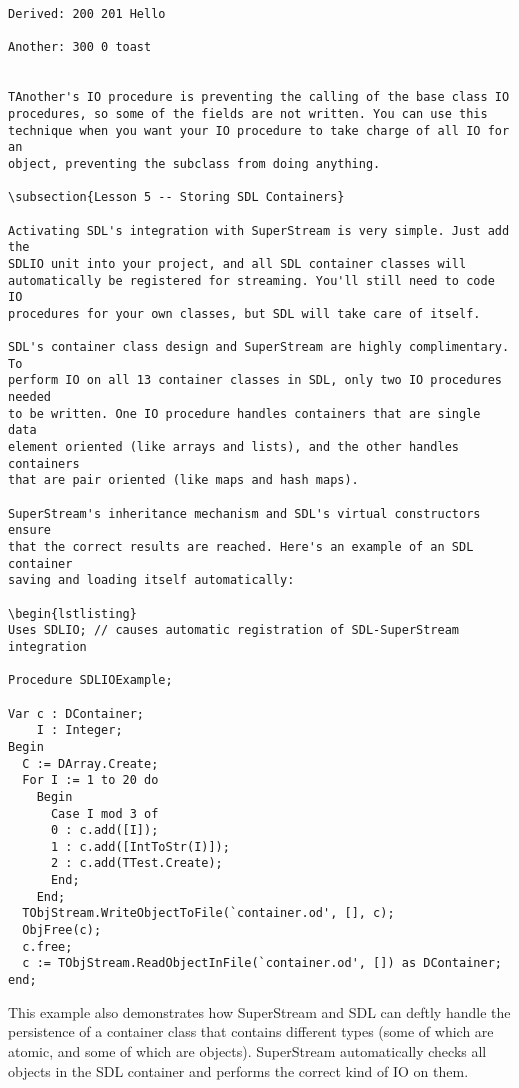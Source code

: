 \documentclass{report}
\begin{document}
\begin{lstlisting}
Derived: 200 201 Hello

Another: 300 0 toast


TAnother's IO procedure is preventing the calling of the base class IO
procedures, so some of the fields are not written. You can use this
technique when you want your IO procedure to take charge of all IO for an
object, preventing the subclass from doing anything.

\subsection{Lesson 5 -- Storing SDL Containers}

Activating SDL's integration with SuperStream is very simple. Just add the
SDLIO unit into your project, and all SDL container classes will
automatically be registered for streaming. You'll still need to code IO
procedures for your own classes, but SDL will take care of itself.

SDL's container class design and SuperStream are highly complimentary.  To
perform IO on all 13 container classes in SDL, only two IO procedures needed
to be written. One IO procedure handles containers that are single data
element oriented (like arrays and lists), and the other handles containers
that are pair oriented (like maps and hash maps).

SuperStream's inheritance mechanism and SDL's virtual constructors ensure
that the correct results are reached. Here's an example of an SDL container
saving and loading itself automatically:

\begin{lstlisting}
Uses SDLIO; // causes automatic registration of SDL-SuperStream  integration

Procedure SDLIOExample;

Var c : DContainer;
    I : Integer;
Begin
  C := DArray.Create;
  For I := 1 to 20 do
    Begin
      Case I mod 3 of
      0 : c.add([I]);
      1 : c.add([IntToStr(I)]);
      2 : c.add(TTest.Create);
      End;
    End;
  TObjStream.WriteObjectToFile(`container.od', [], c);
  ObjFree(c);
  c.free;
  c := TObjStream.ReadObjectInFile(`container.od', []) as DContainer;
end;
\end{lstlisting}

This example also demonstrates how SuperStream and SDL can deftly handle the
persistence of a container class that contains different types (some of
which are atomic, and some of which are objects). SuperStream automatically
checks all objects in the SDL container and performs the correct kind of IO
on them.
\end{document}
